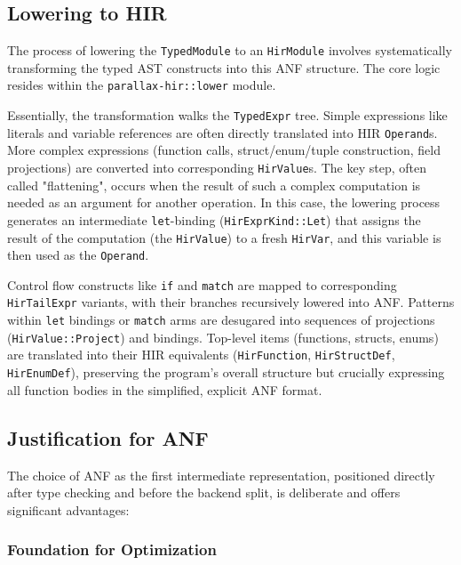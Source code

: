 \subsection{Lowering to HIR}

The process of lowering the \texttt{TypedModule} to an \texttt{HirModule} involves systematically transforming the typed AST constructs into this ANF structure. The core logic resides within the \texttt{parallax-hir::lower} module.

Essentially, the transformation walks the \texttt{TypedExpr} tree. Simple expressions like literals and variable references are often directly translated into HIR \texttt{Operand}s. More complex expressions (function calls, struct/enum/tuple construction, field projections) are converted into corresponding \texttt{HirValue}s. The key step, often called "flattening", occurs when the result of such a complex computation is needed as an argument for another operation. In this case, the lowering process generates an intermediate \texttt{let}-binding (\texttt{HirExprKind::Let}) that assigns the result of the computation (the \texttt{HirValue}) to a fresh \texttt{HirVar}, and this variable is then used as the \texttt{Operand}.

Control flow constructs like \texttt{if} and \texttt{match} are mapped to corresponding \texttt{HirTailExpr} variants, with their branches recursively lowered into ANF. Patterns within \texttt{let} bindings or \texttt{match} arms are desugared into sequences of projections (\texttt{HirValue::Project}) and bindings. Top-level items (functions, structs, enums) are translated into their HIR equivalents (\texttt{HirFunction}, \texttt{HirStructDef}, \texttt{HirEnumDef}), preserving the program's overall structure but crucially expressing all function bodies in the simplified, explicit ANF format.

\subsection{Justification for ANF}

The choice of ANF as the first intermediate representation, positioned directly after type checking and before the backend split, is deliberate and offers significant advantages:

\subsubsection{Foundation for Optimization}

